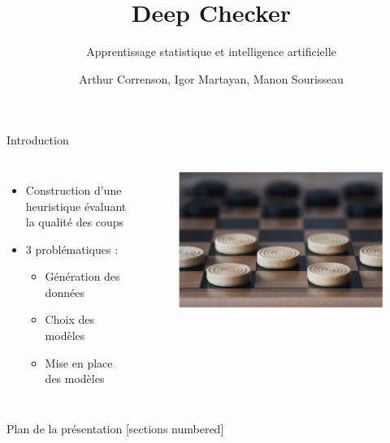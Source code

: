 \documentclass{beamer}
\title{Deep Checker}
\subtitle{Apprentissage statistique et intelligence artificielle}
\date{}
\author{Arthur Correnson, Igor Martayan, Manon Sourisseau}
\institute{Projet de Statistiques, ENS, 2021}
\begin{document}
{\maketitle}

\begin{frame}{Introduction}
    \begin{columns}
        \begin{itemize}
            \item Construction d'une \alert{heuristique} évaluant la qualité des coups
            \item 3 problématiques :
            \begin{itemize}
                \item Génération des données
                \item Choix des modèles
                \item Mise en place des modèles
            \end{itemize}
        \end{itemize}
        \begin{figure}
            \centering
            \includegraphics[width=\columnwidth]{im/dames.png}
        \end{figure}
    \end{columns}
\end{frame}

\begin{frame}{Plan de la présentation}
    [sections numbered]
    \tableofcontents
\end{frame}
\end{document}
